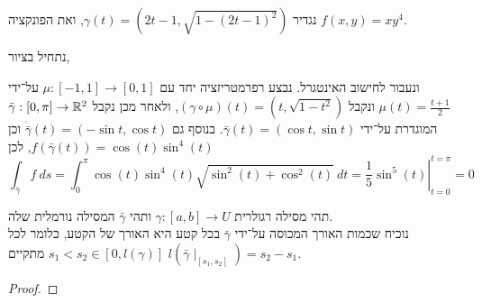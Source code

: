 \subquestion{}
נגדיר $\gamma(t) = (2t - 1, \sqrt{1 - {(2t - 1)}^2})$, ואת הפונקציה $f(x, y) = x y^4$.
\begin{solution}
	נתחיל בציור,
	\begin{otherlanguage}{english}
		\begin{center}
		\end{center}
	\end{otherlanguage}
	ונעבור לחישוב האינטגרל.
	נבצע רפרמטריזציה יחד עם $\mu : [-1, 1] \to [0, 1]$ על־ידי $\mu(t) = \frac{t + 1}{2}$ ונקבל $(\gamma \circ \mu)(t) = (t, \sqrt{1 - t^2})$,
	ולאחר מכן נקבל $\bar{\gamma} : [0, \pi] \to \mathbb{R}^2$ המוגדרת על־ידי $\bar{\gamma}(t) = (\cos t, \sin t)$.
	בנוסף גם $\dot{\bar{\gamma}}(t) = (-\sin t, \cos t)$ וכן $f(\bar{\gamma}(t)) = \cos(t) \sin^4(t)$, לכן
	\[
		\int_{\bar{\gamma}} f\ ds
		= \int_0^\pi \cos(t) \sin^4(t) \sqrt{\sin^2(t) + \cos^2(t)}\ dt
		= \left. \frac{1}{5} \sin^5(t) \right\rvert_{t = 0}^{t = \pi}
		= 0
	\]
\end{solution}

\question{}
תהי מסילה רגולרית $\gamma : [a, b] \to U$ ותהי $\bar{\gamma}$ המסילה נורמלית שלה. \\
נוכיח שכמות האורך המכוסה על־ידי $\bar{\gamma}$ בכל קטע היא האורך של הקטע, כלומר לכל $s_1 < s_2 \in [0, l(\gamma)]$ מתקיים $l(\bar{\gamma} \mid_{[s_1, s_2]}) = s_2 - s_1$.
\begin{proof}
	
\end{proof}


